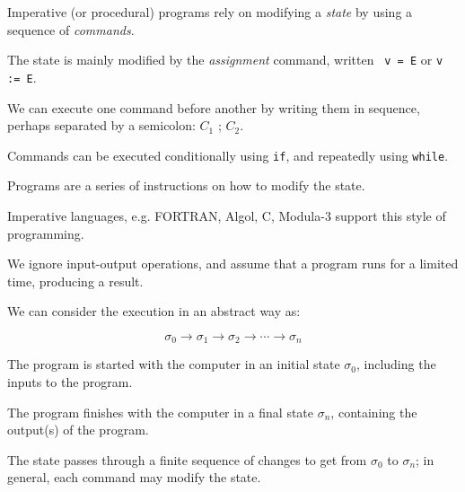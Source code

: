 \begin{slide*}


\vspace*{0.5cm}

Imperative (or procedural) programs rely on modifying a {\em state} by using a
sequence of {\em commands}.

The state is mainly modified by the {\em assignment} command, written {\red \tt
v = E} or {\red \tt v := E}.

We can execute one command before another by writing them in sequence, perhaps
separated by a semicolon: {\red $C_1 \mbox{ ; } C_2$}.

Commands can be executed conditionally using {\red \tt if}, and repeatedly
using {\red \tt while}.

Programs are a series of instructions on how to modify the state.

Imperative languages, e.g. {\black FORTRAN}, {\black Algol}, {\black C},
{\black Modula-3} support this style of programming.

\end{slide*}


\begin{slide*}


\vspace*{0.5cm}

We ignore input-output operations, and assume that a program runs for a limited
time, producing a result.

We can consider the execution in an abstract way as:

{\red $$ \sigma_0 \to \sigma_1 \to \sigma_2 \to \cdots \to \sigma_n $$}

The program is started with the computer in an initial state {\red $\sigma_0$},
including the inputs to the program.

The program finishes with the computer in a final state {\red $\sigma_n$},
containing the output(s) of the program.

The state passes through a finite sequence of changes to get from {\red
$\sigma_0$} to {\red $\sigma_n$}; in general, each command may modify the
state.

\end{slide*}



